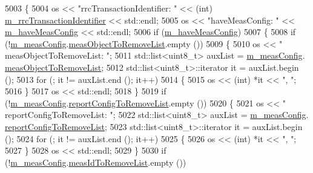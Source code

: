 \begin{DoxyCode}
5003 \{
5004   os << \textcolor{stringliteral}{"rrcTransactionIdentifier: "} << (int) \hyperlink{classns3_1_1RrcConnectionReconfigurationHeader_ae6f276694b1b97f017227127d196cd2a}{m\_rrcTransactionIdentifier} << 
      std::endl;
5005   os << \textcolor{stringliteral}{"haveMeasConfig: "} << \hyperlink{classns3_1_1RrcConnectionReconfigurationHeader_a274b29c01be85788f4857565cf9e05c5}{m\_haveMeasConfig} << std::endl;
5006   \textcolor{keywordflow}{if} (\hyperlink{classns3_1_1RrcConnectionReconfigurationHeader_a274b29c01be85788f4857565cf9e05c5}{m\_haveMeasConfig})
5007     \{
5008       \textcolor{keywordflow}{if} (!\hyperlink{classns3_1_1RrcConnectionReconfigurationHeader_a5fd4a46dd4c2fdefd5fdaa4d6f51a198}{m\_measConfig}.\hyperlink{structns3_1_1LteRrcSap_1_1MeasConfig_a7af3238459db0b504267843da3ab2a4b}{measObjectToRemoveList}.empty ())
5009         \{
5010           os << \textcolor{stringliteral}{"  measObjectToRemoveList: "};
5011           std::list<uint8\_t> auxList = \hyperlink{classns3_1_1RrcConnectionReconfigurationHeader_a5fd4a46dd4c2fdefd5fdaa4d6f51a198}{m\_measConfig}.
      \hyperlink{structns3_1_1LteRrcSap_1_1MeasConfig_a7af3238459db0b504267843da3ab2a4b}{measObjectToRemoveList};
5012           std::list<uint8\_t>::iterator it = auxList.begin ();
5013           \textcolor{keywordflow}{for} (; it != auxList.end (); it++)
5014             \{
5015               os << (int) *it << \textcolor{stringliteral}{", "};
5016             \}
5017           os << std::endl;
5018         \}
5019       \textcolor{keywordflow}{if} (!\hyperlink{classns3_1_1RrcConnectionReconfigurationHeader_a5fd4a46dd4c2fdefd5fdaa4d6f51a198}{m\_measConfig}.\hyperlink{structns3_1_1LteRrcSap_1_1MeasConfig_a1ed9e9ea3b8d2e035f5da7d270cb23d0}{reportConfigToRemoveList}.empty ())
5020         \{
5021           os << \textcolor{stringliteral}{"  reportConfigToRemoveList: "};
5022           std::list<uint8\_t> auxList = \hyperlink{classns3_1_1RrcConnectionReconfigurationHeader_a5fd4a46dd4c2fdefd5fdaa4d6f51a198}{m\_measConfig}.
      \hyperlink{structns3_1_1LteRrcSap_1_1MeasConfig_a1ed9e9ea3b8d2e035f5da7d270cb23d0}{reportConfigToRemoveList};
5023           std::list<uint8\_t>::iterator it = auxList.begin ();
5024           \textcolor{keywordflow}{for} (; it != auxList.end (); it++)
5025             \{
5026               os << (int) *it << \textcolor{stringliteral}{", "};
5027             \}
5028           os << std::endl;
5029         \}
5030       \textcolor{keywordflow}{if} (!\hyperlink{classns3_1_1RrcConnectionReconfigurationHeader_a5fd4a46dd4c2fdefd5fdaa4d6f51a198}{m\_measConfig}.\hyperlink{structns3_1_1LteRrcSap_1_1MeasConfig_a05e09722746ecc1c9dd41a06d4f48e0e}{measIdToRemoveList}.empty ())

\end{DoxyCode}
